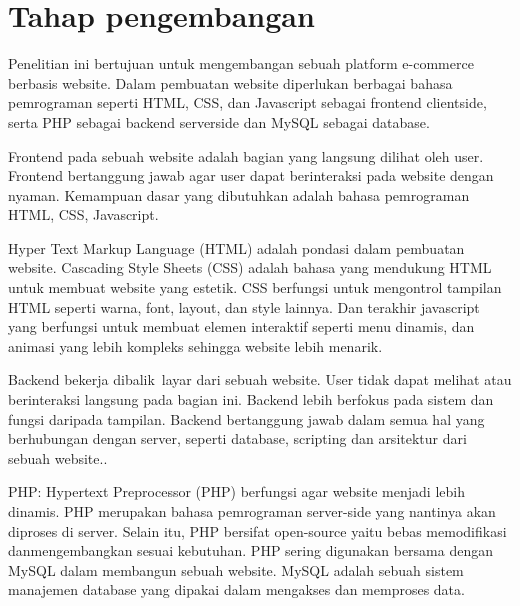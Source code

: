 \section{Tahap pengembangan}
Penelitian ini bertujuan untuk mengembangan sebuah platform e-commerce berbasis website. Dalam pembuatan website diperlukan berbagai bahasa pemrograman seperti HTML, CSS, dan Javascript sebagai frontend clientside, serta PHP sebagai backend serverside dan MySQL sebagai database.
\par Frontend pada sebuah website adalah bagian yang langsung dilihat oleh user. Frontend bertanggung jawab agar user dapat berinteraksi pada website dengan nyaman. Kemampuan dasar yang dibutuhkan adalah bahasa pemrograman HTML, CSS, Javascript.
\par Hyper Text Markup Language (HTML) adalah pondasi dalam pembuatan website. Cascading Style Sheets (CSS) adalah bahasa yang mendukung HTML untuk membuat website yang estetik. CSS berfungsi untuk mengontrol tampilan HTML seperti warna, font, layout, dan style lainnya. Dan terakhir javascript yang berfungsi untuk membuat elemen interaktif seperti menu dinamis, dan animasi yang lebih kompleks sehingga website lebih menarik.
\par Backend bekerja dibalik layar dari sebuah website. User tidak dapat melihat atau berinteraksi langsung pada bagian ini. Backend lebih berfokus pada sistem dan fungsi daripada tampilan. Backend bertanggung jawab dalam semua hal yang berhubungan dengan server, seperti database, scripting dan arsitektur dari sebuah website.. 
\par PHP: Hypertext Preprocessor (PHP) berfungsi agar website menjadi lebih dinamis. PHP merupakan bahasa pemrograman server-side yang nantinya akan diproses di server. Selain itu, PHP bersifat open-source yaitu bebas memodifikasi danmengembangkan sesuai kebutuhan. PHP sering digunakan bersama dengan MySQL dalam membangun sebuah website. MySQL adalah sebuah sistem manajemen database yang dipakai dalam mengakses dan memproses data. 